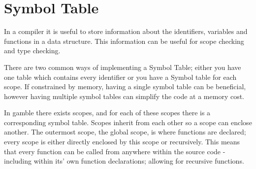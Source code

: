 \section{Symbol Table}
In a compiler it is useful to store information about the identifiers, variables and functions in a data structure. 
This information can be useful for scope checking and type checking.

There are two common ways of implementing a Symbol Table; either you have one table which contains every identifier or you have a Symbol table for each scope. 
If constrained by memory, having a single symbol table can be beneficial, however having multiple symbol tables can simplify the code at a memory cost. 

In \gls{gamble} there exists scopes, and for each of these scopes there is a corresponding symbol table. 
Scopes inherit from each other so a scope can enclose another. 
The outermost scope, the global scope, is where functions are declared; every scope is either directly enclosed by this scope or recursively.
This means that every function can be called from anywhere within the source code - including within its' own function declarations; allowing for recursive functions.

